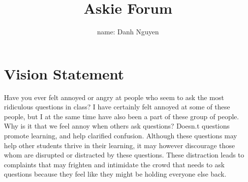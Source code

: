 \documentclass[12pt]{article}
\title{Askie Forum}
\author{
         name: Danh Nguyen 
         \linebreak {onid: nguydanh}
    }
\begin{document}
\maketitle

\tableofcontents
\section{Vision Statement}
\doublespacing
Have you ever felt annoyed or angry at people who seem to ask the most ridiculous questions in class? I have certainly felt annoyed at some of these people, but I at the same time have also been a part of these group of people. Why is it that we feel annoy when others ask questions? Doesn.t questions promote learning, and help clarified confusion. Although these questions may help other students thrive in their learning, it may however discourage those whom are disrupted or distracted by these questions. These distraction leads to complaints that may frighten and intimidate the crowd that needs to ask questions because they feel like they might be holding everyone else back.
\end{document}
